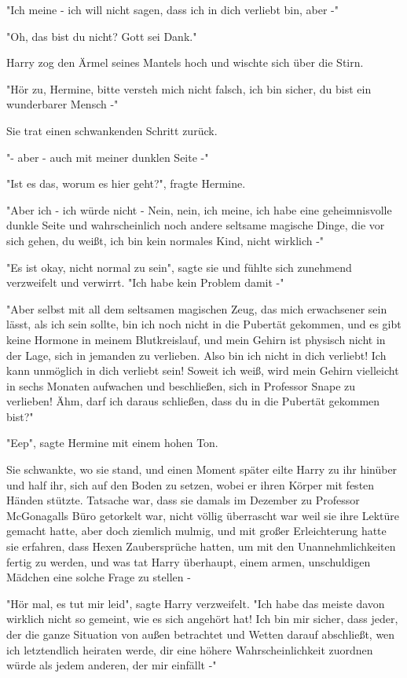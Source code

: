 {"Ich meine - ich will nicht sagen, dass ich in dich verliebt bin, aber -"

"Oh, das bist du nicht? Gott sei Dank."

Harry zog den Ärmel seines Mantels hoch und wischte sich über die Stirn.

"Hör zu, Hermine, bitte versteh mich nicht falsch, ich bin sicher, du bist ein wunderbarer Mensch -"

Sie trat einen schwankenden Schritt zurück.

"- aber - auch mit meiner dunklen Seite -"

"Ist es das, worum es hier geht?", fragte Hermine.

"Aber ich - ich würde nicht - Nein, nein, ich meine, ich habe eine geheimnisvolle dunkle Seite und wahrscheinlich noch andere seltsame magische Dinge, die vor sich gehen, du weißt, ich bin kein normales Kind, nicht wirklich -"

"Es ist okay, nicht normal zu sein", sagte sie und fühlte sich zunehmend verzweifelt und verwirrt. "Ich habe kein Problem damit -"

"Aber selbst mit all dem seltsamen magischen Zeug, das mich erwachsener sein lässt, als ich sein sollte, bin ich noch nicht in die Pubertät gekommen, und es gibt keine Hormone in meinem Blutkreislauf, und mein Gehirn ist physisch nicht in der Lage, sich in jemanden zu verlieben. Also bin ich nicht in dich verliebt! Ich kann unmöglich in dich verliebt sein! Soweit ich weiß, wird mein Gehirn vielleicht in sechs Monaten aufwachen und beschließen, sich in Professor Snape zu verlieben! Ähm, darf ich daraus schließen, dass du in die Pubertät gekommen bist?"

"Eep", sagte Hermine mit einem hohen Ton.

Sie schwankte, wo sie stand, und einen Moment später eilte Harry zu ihr hinüber und half ihr, sich auf den Boden zu setzen, wobei er ihren Körper mit festen Händen stützte. Tatsache war, dass sie damals im Dezember zu Professor McGonagalls Büro getorkelt war, nicht völlig überrascht war weil sie ihre Lektüre gemacht hatte, aber doch ziemlich mulmig, und mit großer Erleichterung hatte sie erfahren, dass Hexen Zaubersprüche hatten, um mit den Unannehmlichkeiten fertig zu werden, und was tat Harry überhaupt, einem armen, unschuldigen Mädchen eine solche Frage zu stellen -

"Hör mal, es tut mir leid", sagte Harry verzweifelt. "Ich habe das meiste davon wirklich nicht so gemeint, wie es sich angehört hat! Ich bin mir sicher, dass jeder, der die ganze Situation von außen betrachtet und Wetten darauf abschließt, wen ich letztendlich heiraten werde, dir eine höhere Wahrscheinlichkeit zuordnen würde als jedem anderen, der mir einfällt -"

}
